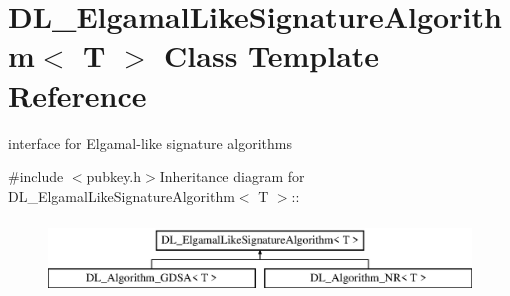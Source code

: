 \hypertarget{class_d_l___elgamal_like_signature_algorithm}{
\section{DL\_\-ElgamalLikeSignatureAlgorithm$<$ T $>$ Class Template Reference}
\label{class_d_l___elgamal_like_signature_algorithm}
}


interface for Elgamal-\/like signature algorithms  


{\ttfamily \#include $<$pubkey.h$>$}Inheritance diagram for DL\_\-ElgamalLikeSignatureAlgorithm$<$ T $>$::\begin{figure}[H]
\begin{center}
\leavevmode
\includegraphics[height=2cm]{class_d_l___elgamal_like_signature_algorithm}
\end{center}
\end{figure}
